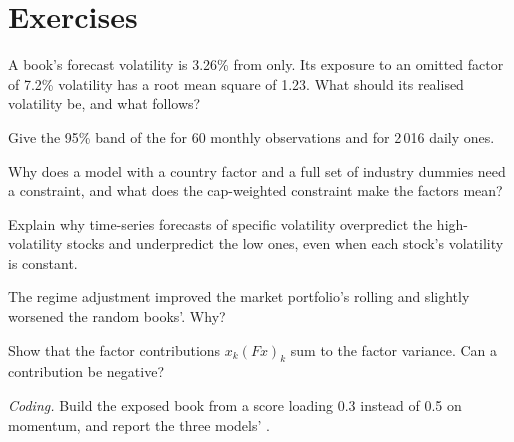 \section{Exercises}

\begin{exercise}[$\star$]\label{exo:rs:risk-models:1}
A book's forecast volatility is 3.26\% from  only. Its exposure to an omitted factor of 7.2\% volatility has a root mean square of 1.23. What
should its realised volatility be, and what  follows?
\end{exercise}

\begin{exercise}[$\star$]\label{exo:rs:risk-models:2}
Give the 95\% band of the  for 60 monthly observations and for 2\,016 daily ones.
\end{exercise}

\begin{exercise}[$\star$]\label{exo:rs:risk-models:3}
Why does a model with a country factor and a full set of industry dummies need a constraint, and what does the cap-weighted constraint make the factors mean?
\end{exercise}

\begin{exercise}[$\star\star$]\label{exo:rs:risk-models:4}
Explain why time-series forecasts of specific volatility overpredict the high-volatility stocks and underpredict the low ones, even when each stock's volatility
is constant.
\end{exercise}

\begin{exercise}[$\star\star$]\label{exo:rs:risk-models:5}
The regime adjustment improved the market portfolio's rolling  and slightly worsened the random books'. Why?
\end{exercise}

\begin{exercise}[$\star\star$]\label{exo:rs:risk-models:6}
Show that the factor contributions $x_k(Fx)_k$ sum to the factor variance. Can a contribution be negative?
\end{exercise}

\begin{exercise}[$\star\star\star$]\label{exo:rs:risk-models:7}
\emph{Coding.} Build the exposed book from a score loading 0.3 instead of 0.5 on momentum, and report the three models' .
\end{exercise}


